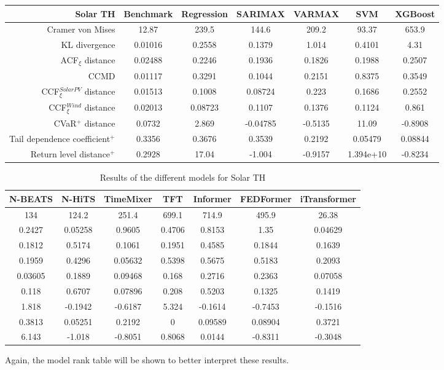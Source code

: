 \begin{table}[ht]
    \footnotesize
    \begin{tabular}[l]{r|c|ccc|cc|}
        \toprule
        \textbf{Solar TH} &Benchmark&Regression&SARIMAX&VARMAX&SVM&XGBoost \\ 
        \midrule            
        Cramer von Mises&12.87&239.5&144.6&209.2&93.37&653.9 \\
        KL divergence&0.01016&0.2558&0.1379&1.014&0.4101&4.31 \\
        ACF$_\xi$ distance&0.02488&0.2246&0.1936&0.1826&0.1988&0.2507 \\
        \midrule
        CCMD&0.01117&0.3291&0.1044&0.2151&0.8375&0.3549 \\
        CCF$_\xi^{Solar PV}$ distance&0.01513&0.1008&0.08724&0.223&0.1686&0.2552 \\
        CCF$_\xi^{Wind}$ distance&0.02013&0.08723&0.1107&0.1376&0.1124&0.861 \\
        \midrule
        CVaR$^+$ distance&0.0732&2.869&-0.04785&-0.5135&11.09&-0.8908 \\
        Tail dependence coefficient$^+$&0.3356&0.3676&0.3539&0.2192&0.05479&0.08844 \\
        Return level distance$^+$&0.2928&17.04&-1.004&-0.9157&1.394e+10&-0.8234 \\
        \bottomrule
    \end{tabular}
\end{table}
\begin{table}[ht]
    \footnotesize
    \begin{flushright}
    \begin{tabular}[r]{|ccc|cccc}
        \toprule
        N-BEATS&N-HiTS&TimeMixer&TFT&Informer&FEDFormer&iTransformer  \\
        \midrule            
        134&124.2&251.4&699.1&714.9&495.9&26.38 \\
        0.2427&0.05258&0.9605&0.4706&0.8153&1.35&0.04629 \\
        0.1812&0.5174&0.1061&0.1951&0.4585&0.1844&0.1639 \\
        \midrule
        0.1959&0.4296&0.05632&0.5398&0.5675&0.5183&0.2093 \\
        0.03605&0.1889&0.09468&0.168&0.2716&0.2363&0.07058 \\
        0.118&0.6707&0.07896&0.208&0.5203&0.1325&0.1419 \\
        \midrule
        1.818&-0.1942&-0.6187&5.324&-0.1614&-0.7453&-0.1516 \\
        0.3813&0.05251&0.2192&0&0.09589&0.08904&0.3721 \\
        6.143&-1.018&-0.8051&0.8068&0.0144&-0.8311&-0.3048 \\
        \bottomrule
    \end{tabular}
    \end{flushright}
    \caption{Results of the different models for Solar TH\label{long}}
    \label{table:results-solar-th}
\end{table}
Again, the model rank table will be shown to better interpret these results.

